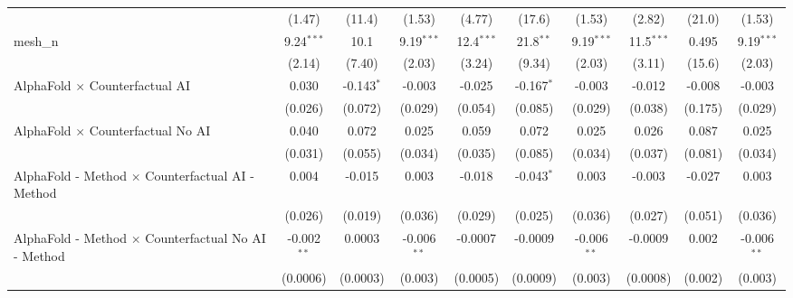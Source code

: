 \begin{tabular}{lccccccccc}
                                                               & (1.47)        & (11.4)        & (1.53)        & (4.77)         & (17.6)       & (1.53)        & (2.82)        & (21.0)         & (1.53)\\   
   mesh\_n                                                     & 9.24$^{***}$  & 10.1          & 9.19$^{***}$  & 12.4$^{***}$   & 21.8$^{**}$  & 9.19$^{***}$  & 11.5$^{***}$  & 0.495          & 9.19$^{***}$\\   
                                                               & (2.14)        & (7.40)        & (2.03)        & (3.24)         & (9.34)       & (2.03)        & (3.11)        & (15.6)         & (2.03)\\   
   AlphaFold $\times$ Counterfactual AI                        & 0.030         & -0.143$^{*}$  & -0.003        & -0.025         & -0.167$^{*}$ & -0.003        & -0.012        & -0.008         & -0.003\\   
                                                               & (0.026)       & (0.072)       & (0.029)       & (0.054)        & (0.085)      & (0.029)       & (0.038)       & (0.175)        & (0.029)\\   
   AlphaFold $\times$ Counterfactual No AI                     & 0.040         & 0.072         & 0.025         & 0.059          & 0.072        & 0.025         & 0.026         & 0.087          & 0.025\\   
                                                               & (0.031)       & (0.055)       & (0.034)       & (0.035)        & (0.085)      & (0.034)       & (0.037)       & (0.081)        & (0.034)\\   
   AlphaFold - Method $\times$ Counterfactual AI - Method      & 0.004         & -0.015        & 0.003         & -0.018         & -0.043$^{*}$ & 0.003         & -0.003        & -0.027         & 0.003\\   
                                                               & (0.026)       & (0.019)       & (0.036)       & (0.029)        & (0.025)      & (0.036)       & (0.027)       & (0.051)        & (0.036)\\   
   AlphaFold - Method $\times$ Counterfactual No AI - Method   & -0.002$^{**}$ & 0.0003        & -0.006$^{**}$ & -0.0007        & -0.0009      & -0.006$^{**}$ & -0.0009       & 0.002          & -0.006$^{**}$\\   
                                                               & (0.0006)      & (0.0003)      & (0.003)       & (0.0005)       & (0.0009)     & (0.003)       & (0.0008)      & (0.002)        & (0.003)\\   

\end{tabular}
